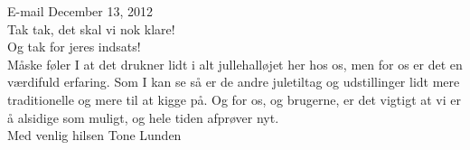 \begin{fancyquotes}
E-mail December 13, 2012\\
Tak tak, det skal vi nok klare!\\

Og tak for jeres indsats!\\
M{\aa}ske f{\o}ler I at det drukner lidt i alt jullehall{\o}jet her hos os, men for os er det en v{\ae}rdifuld erfaring. Som I kan se s{\aa} er de andre juletiltag og udstillinger lidt mere traditionelle og mere til at kigge p{\aa}. Og for os, og brugerne, er det vigtigt at vi er {\aa} alsidige som muligt, og hele tiden afpr{\o}ver nyt.\\

Med venlig hilsen
Tone Lunden
\end{fancyquotes}